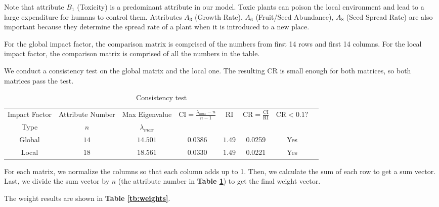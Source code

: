 \documentclass[12pt]{article}
\begin{document}
		Note that attribute $B_1$ (Toxicity) is a predominant attribute in our model.  Toxic plants can poison the local environment and lead to a large expenditure for humans to control them.  Attributes $A_3$ (Growth Rate), $A_6$ (Fruit/Seed Abundance), $A_8$ (Seed Spread Rate) are also important because they  determine the spread rate of a plant when it is introduced to a new place.
		
		For the global impact factor, the comparison matrix is comprised of the numbers from first 14 rows and first 14 columns.  For the local impact factor, the comparison matrix is comprised of all the numbers in the table.  
		
		We conduct a consistency test on the global matrix and the local one.  The resulting CR is small enough for both matrices, so both matrices pass the test.
		
		{
			\fontsize{10}{14}\selectfont
			{
				\begin{longtable}{cccccccc}
					\caption{Consistency test}
					\label{tb:consistency}\\
					
					\toprule
					Impact Factor&Attribute Number&Max Eigenvalue 
					&\multirow{2}{*}{$\mathrm{CI}=\displaystyle \frac{\lambda_{max}-n}{n-1}$}
					&\multirow{2}{*}{$\mathrm{RI}$}
					&\multirow{2}{*}{$\mathrm{CR}=\displaystyle \frac{\mathrm{CI}}{\mathrm{RI}}$}
					&\multirow{2}{*}{$\mathrm{CR}<0.1?$}\\
					Type&$n$&$\lambda_{max}$\\
					\toprule
					Global&$14$&$14.501$&$0.0386$&$1.49$&0.0259&Yes\\
					Local&$18$&$18.561$&$0.0330$&$1.49$&0.0221&Yes\\
					\bottomrule
				\end{longtable}
			}
		}	
		
		For each matrix, we normalize the columns so that each column adds up to 1.  Then, we calculate the sum of each row to get a sum vector.  Last, we divide the sum vector by $n$ (the attribute number in \textbf{Table \ref{tb:consistency}}) to get the final weight vector.  
		
		The weight results are shown in \textbf{Table \ref{tb:weights}}.
	
\end{document}
